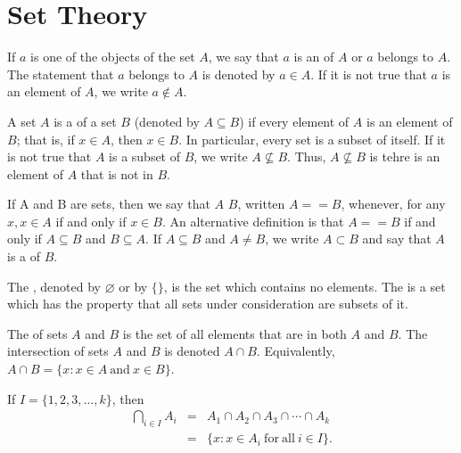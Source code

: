 \cleardoublepage
{}
\chapter*{Set Theory} \nocite{Anderson:2001aa}

\begin{definition}
  If $a$ is one of the objects of the set $A$, we say that $a$ is an  of $A$ or $a$ belongs to $A$. The statement that $a$ belongs to $A$ is denoted by $a \in{} A$. If it is not true that $a$ is an element of $A$, we write $a \not\in{} A$.
\end{definition}

\begin{definition}
  A set $A$ is a  of a set $B$ (denoted by $A \subseteq B$) if every element of $A$ is an element of $B$; that is, if $x \in A$, then $x \in B$. In particular, every set is a subset of itself. If it is not true that $A$ is a subset of $B$, we write $A \not\subseteq B$. Thus, $A \not\subseteq B$ is tehre is an element of $A$ that is not in $B$.
\end{definition}

\begin{definition}
  If A and B are sets, then we say that $A$  $B$, written $A == B$, whenever, for any $x, x \in A$ if and only if $x \in B$. An alternative definition is that $A == B$ if and only if $A \subseteq B$ and $B \subseteq A$. If $A \subseteq B$ and $A \neq B$, we write $A \subset B$ and say that $A$ is a  of $B$.
\end{definition}

\begin{definition}
  The , denoted by $\varnothing$ or by $\{\}$, is the set which contains no elements. The  is a set which has the property that all sets under consideration are subsets of it.
\end{definition}

\begin{definition}
  The  of sets $A$ and $B$ is the set of all elements that are in both $A$ and $B$. The intersection of sets $A$ and $B$ is denoted $A \cap B$. Equivalently, $A \cap B = \{x : x \in A\ \mathrm{and}\ x \in B\}$.
\end{definition}

\begin{definition}
 If $I = \{1, 2, 3, \dots, k\}$, then
 \begin{eqnarray*}
   \bigcap_{i \in I} A_i & = & A_1 \cap A_2 \cap A_3 \cap \cdots \cap A_k\\
   & = & \{x : x \in A_i\ \mathrm{for\ all}\ i \in I\}.
 \end{eqnarray*}
\end{definition}

